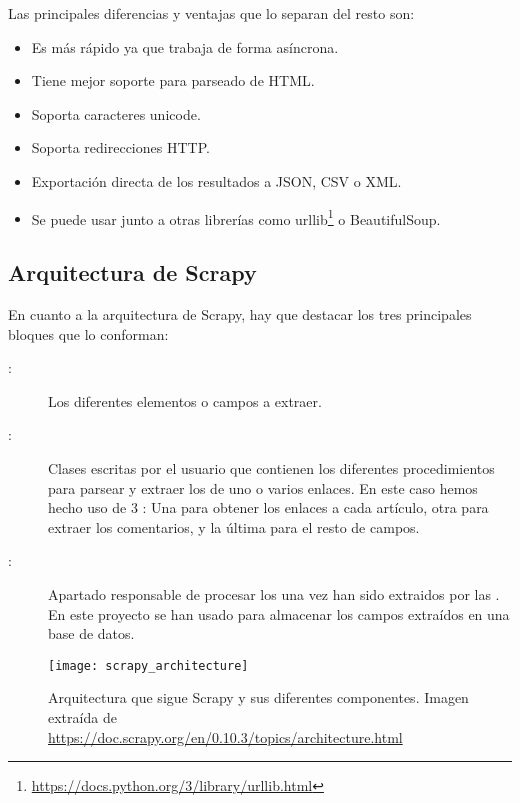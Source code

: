 Las principales diferencias y ventajas que lo separan del resto son:
\begin{itemize}
    \item Es más rápido ya que trabaja de forma asíncrona.
    \item Tiene mejor soporte para parseado de HTML.
    \item Soporta caracteres unicode.
    \item Soporta redirecciones HTTP.
    \item Exportación directa de los resultados a JSON, CSV o XML.
    \item Se puede usar junto a otras librerías como urllib\footnote{\url{https://docs.python.org/3/library/urllib.html}} o BeautifulSoup.
\end{itemize}

\subsection{Arquitectura de Scrapy}

En cuanto a la arquitectura de Scrapy, hay que destacar los tres principales bloques que lo conforman:

\begin{description}
    \item[:] Los diferentes elementos o campos a extraer.
    \item[:] Clases escritas por el usuario que contienen los diferentes procedimientos para parsear y extraer los  de uno o varios enlaces. En este caso hemos hecho uso de 3 : Una para obtener los enlaces a cada artículo, otra para extraer los comentarios, y la última para el resto de campos.
    \item[:] Apartado responsable de procesar los  una vez han sido extraidos por las . En este proyecto se han usado para almacenar los campos extraídos en una base de datos.
\end{description}

\FloatBarrier
    \begin{figure}[!h]
    \centering
    \texttt{[image: scrapy\_architecture]}
    \caption[Arquitectura que sigue Scrapy y sus diferentes componentes]{Arquitectura que sigue Scrapy y sus diferentes componentes.
    \newline
    Imagen extraída de \url{https://doc.scrapy.org/en/0.10.3/topics/architecture.html}}
    \label{fig}
    \end{figure}
\FloatBarrier

